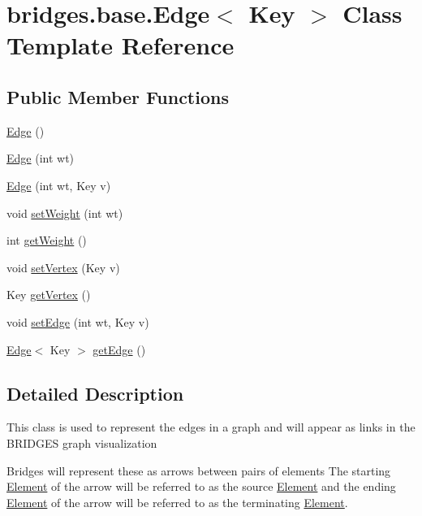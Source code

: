 \hypertarget{classbridges_1_1base_1_1_edge}{}\section{bridges.\+base.\+Edge$<$ Key $>$ Class Template Reference}
\label{classbridges_1_1base_1_1_edge}
\subsection*{Public Member Functions}
\begin{DoxyCompactItemize}
\item 
\hyperlink{classbridges_1_1base_1_1_edge_ac070f05141bfbc7c575591e59d508476}{Edge} ()
\item 
\hyperlink{classbridges_1_1base_1_1_edge_a8567ee2a3d4d655f0a2a2258767238d6}{Edge} (int wt)
\item 
\hyperlink{classbridges_1_1base_1_1_edge_a503c093e63f5df1071233427496d9d08}{Edge} (int wt, Key v)
\item 
void \hyperlink{classbridges_1_1base_1_1_edge_a5b671fc2589d95b125b0b2cedbab0f1a}{set\+Weight} (int wt)
\item 
int \hyperlink{classbridges_1_1base_1_1_edge_a4cc9219e5842cafb7c5891ba15147ec1}{get\+Weight} ()
\item 
void \hyperlink{classbridges_1_1base_1_1_edge_a596d119b0bcfe8c455acae65832bf25d}{set\+Vertex} (Key v)
\item 
Key \hyperlink{classbridges_1_1base_1_1_edge_ada8056d4944cfea69f438af8274c1f79}{get\+Vertex} ()
\item 
void \hyperlink{classbridges_1_1base_1_1_edge_a02f0ad2a38fff319ccc8e9619f7db7f9}{set\+Edge} (int wt, Key v)
\item 
\hyperlink{classbridges_1_1base_1_1_edge}{Edge}$<$ Key $>$ \hyperlink{classbridges_1_1base_1_1_edge_a666bb076c206e572d9fca072b58db162}{get\+Edge} ()
\end{DoxyCompactItemize}


\subsection{Detailed Description}
This class is used to represent the edges in a graph and will appear as links in the B\+R\+I\+D\+G\+E\+S graph visualization 

Bridges will represent these as arrows between pairs of elements The starting \hyperlink{classbridges_1_1base_1_1_element}{Element} of the arrow will be referred to as the source \hyperlink{classbridges_1_1base_1_1_element}{Element} and the ending \hyperlink{classbridges_1_1base_1_1_element}{Element} of the arrow will be referred to as the terminating \hyperlink{classbridges_1_1base_1_1_element}{Element}.

